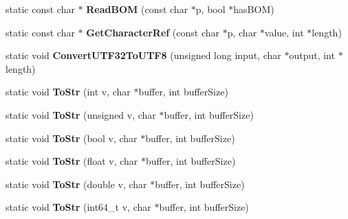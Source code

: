 \begin{DoxyCompactItemize}
\mbox{\label{classtinyxml2_1_1_x_m_l_util_ae9bcb2bc3cd6475fdc644c8c17790555}} 
static const char $\ast$ {\bfseries Read\+B\+OM} (const char $\ast$p, bool $\ast$has\+B\+OM)
\item 
\mbox{\label{classtinyxml2_1_1_x_m_l_util_a5a96e5144a8d693dc4bcd783d9964648}} 
static const char $\ast$ {\bfseries Get\+Character\+Ref} (const char $\ast$p, char $\ast$value, int $\ast$length)
\item 
\mbox{\label{classtinyxml2_1_1_x_m_l_util_a31c00d5c5dfb38382de1dfcaf4be3595}} 
static void {\bfseries Convert\+U\+T\+F32\+To\+U\+T\+F8} (unsigned long input, char $\ast$output, int $\ast$length)
\item 
\mbox{\label{classtinyxml2_1_1_x_m_l_util_a3cd6c703d49b9d51bdf0f4ff6aa021c7}} 
static void {\bfseries To\+Str} (int v, char $\ast$buffer, int buffer\+Size)
\item 
\mbox{\label{classtinyxml2_1_1_x_m_l_util_ac00c2e52c1c36dab3ff41d86a9bf60f9}} 
static void {\bfseries To\+Str} (unsigned v, char $\ast$buffer, int buffer\+Size)
\item 
\mbox{\label{classtinyxml2_1_1_x_m_l_util_adba0718527ae9e80f663a71ea325cb11}} 
static void {\bfseries To\+Str} (bool v, char $\ast$buffer, int buffer\+Size)
\item 
\mbox{\label{classtinyxml2_1_1_x_m_l_util_a8957ad44fee5fa02ba52d73aad4d0a31}} 
static void {\bfseries To\+Str} (float v, char $\ast$buffer, int buffer\+Size)
\item 
\mbox{\label{classtinyxml2_1_1_x_m_l_util_a1cd141e50980fcddd6bf9af5de4b1db7}} 
static void {\bfseries To\+Str} (double v, char $\ast$buffer, int buffer\+Size)
\item 
\mbox{\label{classtinyxml2_1_1_x_m_l_util_a26a8cb5b833ad587b3af39469c8111de}} 
static void {\bfseries To\+Str} (int64\+\_\+t v, char $\ast$buffer, int buffer\+Size)
\item 

\end{DoxyCompactItemize}
